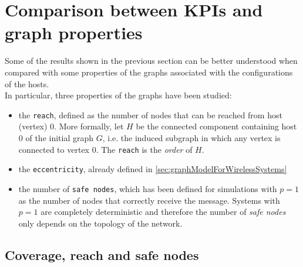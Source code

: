 \section{Comparison between KPIs and graph properties}

Some of the results shown in the previous section can be better understood when compared with some properties of the graphs associated with the configurations of the hosts.\\
In particular, three properties of the graphs have been studied:

\begin{itemize}
	\item the \texttt{reach}, defined as the number of nodes that can be reached from host (vertex) 0. More formally, let $H$ be the connected component containing host 0 of the initial graph $G$, i.e. the induced subgraph in which any vertex is connected to vertex 0. The \texttt{reach} is the \textit{order} of $H$.
	\item the \texttt{eccentricity}, already defined in \ref{sec:graphModelForWirelessSystems}
	\item the number of \texttt{safe nodes}, which has been defined for simulations with $p=1$ as the number of nodes that correctly receive the message. Systems with $p=1$ are completely deterministic and therefore the number of \textit{safe nodes} only depends on the topology of the network.
\end{itemize}

\subsection{Coverage, reach and safe nodes}

